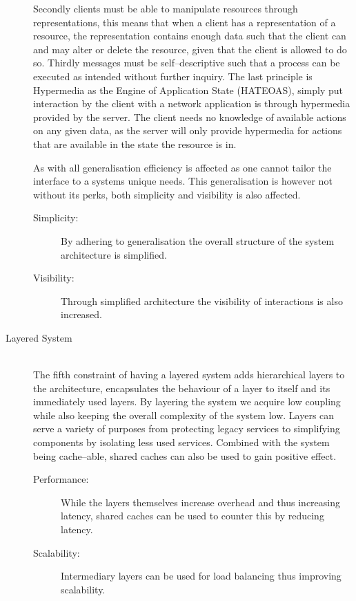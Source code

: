 \begin{description}
    Secondly clients must be able to manipulate resources through representations, this means that when a client has a representation of a resource, the representation contains enough data such that the client can and may alter or delete the resource, given that the client is allowed to do so.
    Thirdly messages must be self--descriptive such that a process can be executed as intended without further inquiry.
    The last principle is Hypermedia as the Engine of Application State (HATEOAS), simply put interaction by the client with a network application is through hypermedia provided by the server.
    The client needs no knowledge of available actions on any given data, as the server will only provide hypermedia for actions that are available in the state the resource is in.

    As with all generalisation efficiency is affected as one cannot tailor the interface to a systems unique needs.
    This generalisation is however not without its perks, both simplicity and visibility is also affected.
    \begin{description}
        \item[Simplicity:] By adhering to generalisation the overall structure of the system architecture is simplified.
        \item[Visibility:] Through simplified architecture the visibility of interactions is also increased.
    \end{description}
    \item [Layered System\label{layeredsystem}] \hfill \\
    The fifth constraint of having a layered system adds hierarchical layers to the architecture, encapsulates the behaviour of a layer to itself and its immediately used layers.
    By layering the system we acquire low coupling while also keeping the overall complexity of the system low.
    Layers can serve a variety of purposes from protecting legacy services to simplifying components by isolating less used services.
    Combined with the system being cache--able, shared caches can also be used to gain positive effect.
    \begin{description}
        \item[Performance:] While the layers themselves increase overhead and thus increasing latency, shared caches can be used to counter this by reducing latency.
        \item[Scalability:] Intermediary layers can be used for load balancing thus improving scalability.

\end{description}
\end{description}
